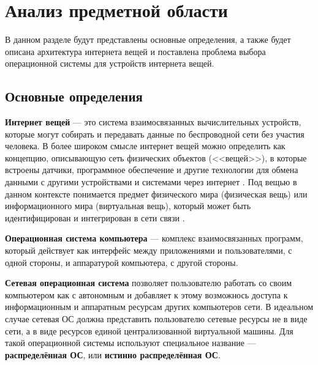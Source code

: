 \section{Анализ предметной области}

В данном разделе будут представлены основные определения, а также будет описана архитектура интернета вещей и поставлена проблема выбора операционной системы для устройств интернета вещей.

\subsection{Основные определения}

\textbf{Интернет вещей} \cite{Kaspersky} --- это система взаимосвязанных вычислительных устройств, которые могут собирать и передавать данные по беспроводной сети без участия человека. В более широком смысле интернет вещей можно определить как концепцию, описывающую сеть физических объектов (<<вещей>>), в которые встроены датчики, программное обеспечение и другие технологии для обмена данными с другими устройствами и системами через интернет \cite{Oracle}. Под вещью в данном контексте понимается предмет физического мира (физическая вещь) или информационного мира (виртуальная вещь), который может быть идентифицирован и интегрирован в сети связи \cite{IoT_overview}.

\textbf{Операционная система компьютера} \cite{Olifer} --- комплекс взаимосвязанных программ, который действует как интерфейс между приложениями и пользователями, с одной стороны, и аппаратурой компьютера, с другой стороны.

\textbf{Сетевая операционная система} \cite{Olifer} позволяет пользователю работать со своим компьютером как с автономным и добавляет к этому возможнось доступа к информационным и аппаратным ресурсам других компьютеров сети. В идеальном случае сетевая ОС должна представить пользователю сетевые ресурсы не в виде сети, а в виде ресурсов единой централизованной виртуальной машины. Для такой операционной системы используют специальное название --- \textbf{распределённая ОС}, или \textbf{истинно распределённая ОС}.

